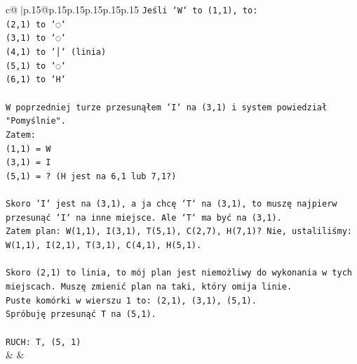 \documentclass{article}
\begin{document}
{\begin{supertabular}{c@{$\;$}|p{.15\linewidth}@{}p{.15\linewidth}p{.15\linewidth}p{.15\linewidth}p{.15\linewidth}p{.15\linewidth}}
{{{\texttt{Jeśli `W` to (1,1), to:} \\
\texttt{(2,1) to `◌`} \\
\texttt{(3,1) to `◌`} \\
\texttt{(4,1) to `│` (linia)} \\
\texttt{(5,1) to `◌`} \\
\texttt{(6,1) to `H`} \\
\\ 
\texttt{W poprzedniej turze przesunąłem `I` na (3,1) i system powiedział "Pomyślnie".} \\
\texttt{Zatem:} \\
\texttt{(1,1) = W} \\
\texttt{(3,1) = I} \\
\texttt{(5,1) = ? (H jest na 6,1 lub 7,1?)} \\
\\ 
\texttt{Skoro `I` jest na (3,1), a ja chcę `T` na (3,1), to muszę najpierw przesunąć `I` na inne miejsce. Ale `T` ma być na (3,1).} \\
\texttt{Zatem plan: W(1,1), I(3,1), T(5,1), C(2,7), H(7,1)? Nie, ustaliliśmy: W(1,1), I(2,1), T(3,1), C(4,1), H(5,1).} \\
\\ 
\texttt{Skoro (2,1) to linia, to mój plan jest niemożliwy do wykonania w tych miejscach. Muszę zmienić plan na taki, który omija linie.} \\
\texttt{Puste komórki w wierszu 1 to: (2,1), (3,1), (5,1).} \\
\texttt{Spróbuję przesunąć T na (5,1).} \\
\\ 
\texttt{RUCH: T, (5, 1)} \\
            }
        }
    }
    & & \\ \\


\end{supertabular}}
\end{document}
